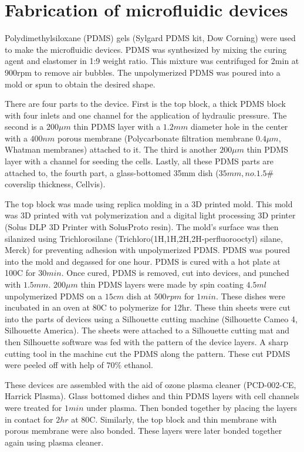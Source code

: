 \section{Fabrication of microfluidic devices}
 
Polydimethylsiloxane (PDMS) gels (Sylgard PDMS kit, Dow Corning) were used to make the microfluidic devices. PDMS was synthesized by mixing the curing agent and elastomer in 1:9 weight ratio. This mixture was centrifuged for 2min at 900rpm to remove air bubbles. The unpolymerized PDMS was poured into a mold or spun to obtain the desired shape. 

There are four parts to the device. First is the top block, a thick PDMS block with four inlets and one channel for the application of hydraulic pressure. The second is a $200 \mu m$ thin PDMS layer with a $1.2mm$ diameter hole in the center with a $400nm$ porous membrane (Polycarbonate filtration membrane $0.4\mu m$, Whatman membranes) attached to it. The third is another $200 \mu m$ thin PDMS layer with a channel for seeding the cells. Lastly, all these PDMS parts are attached to, the fourth part, a glass-bottomed 35mm dish ($35mm, no. 1.5\#$ coverslip thickness, Cellvis). 

The top block was made using replica molding in a 3D printed mold. This mold was 3D printed with vat polymerization and a digital light processing 3D printer (Solus DLP 3D Printer with SolusProto resin). The mold’s surface was then silanized using Trichlorosilane (Trichloro(1H,1H,2H,2H-perfluorooctyl) silane, Merck) for preventing adhesion with unpolymerized PDMS. PDMS was poured into the mold and degassed for one hour. PDMS is cured with a hot plate at 100\textdegree{}C for $30min$. Once cured, PDMS is removed, cut into devices, and punched with $1.5mm$. $200\mu m$ thin PDMS layers were made by spin coating $4.5ml$ unpolymerized PDMS on a $15cm$ dish at $500rpm$ for $1min$. These dishes were incubated in an oven at 80\textdegree{}C to polymerize for 12hr. These thin sheets were cut into the parts of devices using a Silhouette cutting machine (Silhouette Cameo 4, Silhouette America). The sheets were attached to a Silhouette cutting mat and then Silhouette software was fed with the pattern of the device layers. A sharp cutting tool in the machine cut the PDMS along the pattern. These cut PDMS were peeled off with help of $70\%$ ethanol. 

These devices are assembled with the aid of ozone plasma cleaner (PCD-002-CE, Harrick Plasma). Glass bottomed dishes and thin PDMS layers with cell channels were treated for $1 min$ under plasma. Then bonded together by placing the layers in contact for $2 hr$ at 80\textdegree{}C. Similarly, the top block and thin membrane with porous membrane were also bonded. These layers were later bonded together again using plasma cleaner.


